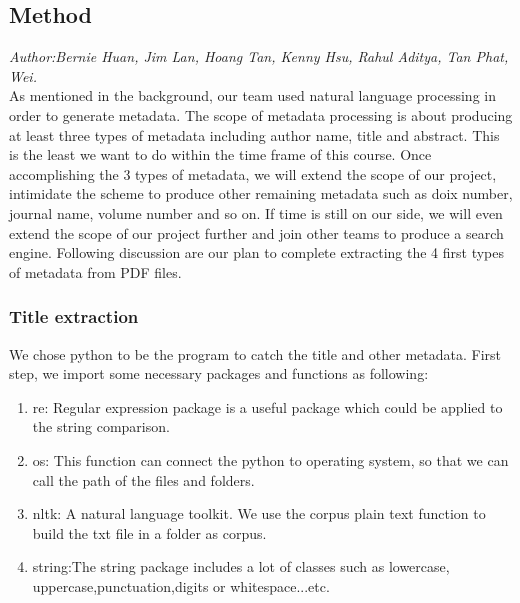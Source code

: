 \subsection{Method} %
\textit{\footnotesize Author:Bernie Huan, Jim Lan, Hoang Tan, Kenny Hsu, Rahul Aditya, Tan Phat, Wei.}\\

As mentioned in the background, our team used natural language processing in order to generate metadata. 
The scope of metadata processing is about producing at least three types of metadata including author name, title and abstract. 
This is the least we want to do within the time frame of this course. 
Once accomplishing the 3 types of metadata, we will extend the scope of our project, intimidate the scheme to produce other remaining metadata such as doix number, journal name, volume number and so on. 
If time is still on our side, we will even extend the scope of our project further and join other teams to produce a search engine. 
Following discussion are our plan to complete extracting the 4 first types of metadata from PDF files.

\subsubsection{Title extraction}

We chose python to be the program to catch the title and other metadata. 
First step, we import some necessary packages and functions as following:

\begin{enumerate}
	
	\item re: Regular expression package is a useful package which could be applied to the string comparison.
	\item os: This function can connect the python to operating system, so that we can call the path of the files and folders.
	\item nltk: A natural language toolkit.	We use the corpus plain text function to build the txt file in a folder as corpus.
	\item string:The string package includes a lot of classes such as lowercase, uppercase,punctuation,digits or whitespace...etc.
	
\end{enumerate}  

